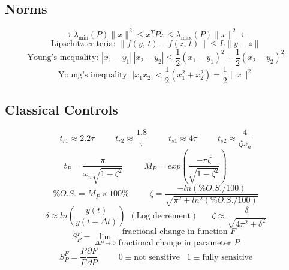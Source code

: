 \documentclass[twocolumn]{article}    %
\begin{document}
\RaggedRight
\footnotesize %
\subsection*{Norms}
\begin{equation*}
    \longrightarrow \lambda_{\min} (P) \|x\|^2 \leq x^TPx \leq \lambda_{\max}(P) \|x\|^2 \longleftarrow
\end{equation*}
\begin{equation*}
    \text{Lipschitz criteria: } \|f(y,\,t) - f(z,\, t) \| \leq L \|y - z\|
\end{equation*}
\begin{equation*}
    \text{Young's inequality: } |x_1 - y_1|\,|x_2-y_2| \leq \frac{1}{2}(x_1-y_1)^2 + \frac{1}{2}(x_2-y_2)^2 
\end{equation*}
\begin{equation*}
    \text{Young's inequality: } |x_1x_2| < \frac{1}{2}(x_1^2 + x_2^2) = \frac{1}{2}\|x\|^2
\end{equation*}

\color{black}
\subsection*{Classical Controls}
\begin{equation*}
    t_{r1} \approx 2.2\tau \hspace{30pt} t_{r2} \approx\frac{1.8}{\tau} \hspace{30pt} t_{s1} \approx 4\tau \hspace{30pt} t_{s2} \approx\frac{4}{\zeta \omega_n}
\end{equation*}
\begin{equation*}
    t_P = \frac{\pi}{\omega_n\sqrt{1-\zeta^2}} \hspace{30pt} M_P = exp\left(\frac{-\pi\zeta}{\sqrt{1-\zeta^2}}  \right) \hspace{30pt} 
\end{equation*}
\begin{equation*}
    \%O.S. = M_P \times 100\% \hspace{30pt} \zeta = \frac{-ln(\%O.S./100)}{\sqrt{\pi^2 +ln^2(\%O.S. /100)}}
\end{equation*}
\begin{equation*}
    \delta \approx ln\left( \frac{y(t)}{y(t+\Delta t)} \right) \hspace{5pt} (\text{Log decrement}) \hspace{20pt} \zeta \approx \frac{\delta}{\sqrt{4\pi ^2 +\delta^2}} 
\end{equation*}
\begin{equation*}
    S_P^F = \lim_{\Delta P \to 0} \frac{\text{fractional change in function }F}{\text{fractional change in parameter }P}
\end{equation*}
\begin{equation*}
    S^F_P = \frac{P}{F}  \frac{\partial{F}}{\partial{P}} \hspace{30pt} 0 \equiv \text{not sensitive} \hspace{10pt} 1 \equiv \text{fully sensitive}
\end{equation*}
\end{document}
